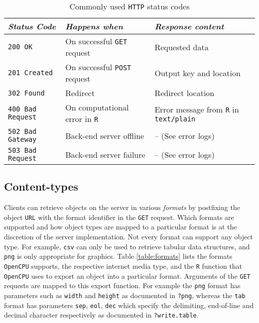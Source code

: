 \documentclass{article}
\newcommand{\URL}{\texttt{URL}\xspace}
\newcommand{\GET}{\texttt{GET}\xspace}
\newcommand{\R}{\texttt{R}\xspace}
\newcommand{\HTTP}{\texttt{HTTP}\xspace}
\newcommand{\OpenCPU}{\texttt{OpenCPU}\xspace}
\begin{document}
\begin{table}[H]
\centering
\def\arraystretch{1.3}%
\begin{tabular}{@{}lll@{}}
\toprule
\emph{Status Code}              & \emph{Happens when}                             & \emph{Response content}                     \\ \midrule
\texttt{200 OK}          & On successful \texttt{GET} request                     & Requested data                    \\
\texttt{201 Created}     & On successful \texttt{POST} request                    & Output key and location                     \\
\texttt{302 Found}       & Redirect                                               & Redirect location                   \\
\texttt{400 Bad Request} & On computational error in \R                                     & Error message from \R in \texttt{text/plain} \\
\texttt{502 Bad Gateway} & Back-end server offline                            & -- (See error logs) \\
\texttt{503 Bad Request} & Back-end server failure                                & -- (See error logs) \\ \bottomrule                          
\end{tabular}
\caption{Commonly used \HTTP status codes}
\label{table:statuscodes}
\end{table}

\subsection{Content-types}

Clients can retrieve objects on the server in various \emph{formats} by postfixing the object \URL with the format identifier in the \GET request. Which formats are supported and how object types are mapped to a particular format is at the discretion of the server implementation. Not every format can support any object type. For example, \texttt{csv} can only be used to retrieve tabular data structures, and \texttt{png} is only appropriate for graphics. Table \ref{table:formats} lists the formats \OpenCPU supports, the respective internet media type, and the \R function that \OpenCPU uses to export an object into a particular format. Arguments of the \GET requests are mapped to this export function. For example the \texttt{png} format has parameters such as \texttt{width} and \texttt{height} as documented in \texttt{?png}, whereas the \texttt{tab} format has parameters \texttt{sep}, \texttt{eol}, \texttt{dec} which specify the delimiting, end-of-line and decimal character respectively as documented in \texttt{?write.table}.
\end{document}
